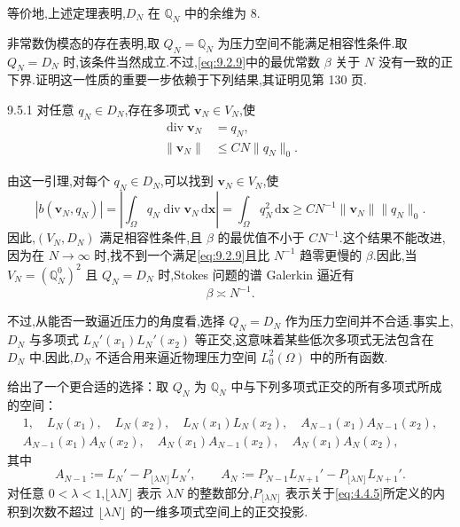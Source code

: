 等价地,上述定理表明,\(D_N\) 在 \(\mathbb Q_N\) 中的余维为 \(8\).

非常数伪模态的存在表明,取 \(Q_N=\mathbb Q_N\) 为压力空间不能满足相容性条件.取 \(Q_N=D_N\) 时,该条件当然成立.不过,\eqref{eq:9.2.9}中的最优常数 \(\beta\) 关于 \(N\) 没有一致的正下界.证明这一性质的重要一步依赖于下列结果,其证明见第 130 页.

\begin{lemma}[]{9.5.1}
对任意 \(q_N\in D_N\),存在多项式 \(\boldsymbol{v}_N\in V_N\),使
\begin{align}
  \operatorname{div}\boldsymbol{v}_N&=q_N,\label{eq:9.5.18}\\
  \|\boldsymbol{v}_N\|&\le CN\|q_N\|_0.\label{eq:9.5.19}
\end{align}
\end{lemma}

由这一引理,对每个 \(q_N\in D_N\),可以找到 \(\boldsymbol{v}_N\in V_N\),使
\[
  |b(\boldsymbol{v}_N,q_N)|=
      \left|\int_\Omega q_N\operatorname{div}\boldsymbol{v}_N\,\mathrm d\boldsymbol{x}\right|
        =\int_\Omega q_N^2\,\mathrm d\boldsymbol{x}
        \ge CN^{-1}\|\boldsymbol{v}_N\|\|q_N\|_0.
\]
因此,\((V_N,D_N)\) 满足相容性条件,且 \(\beta\) 的最优值不小于 \(CN^{-1}\).这个结果不能改进,因为在 \(N\to\infty\) 时,找不到一个满足\eqref{eq:9.2.9}且比 \(N^{-1}\) 趋零更慢的 \(\beta\).因此,当 \(V_N=(\mathbb Q_N^0)^2\) 且 \(Q_N=D_N\) 时,Stokes 问题的谱 Galerkin 逼近有
\begin{equation}\label{eq:9.5.20}
  \beta\asymp N^{-1}.
\end{equation}

不过,从能否一致逼近压力的角度看,选择 \(Q_N=D_N\) 作为压力空间并不合适.事实上,\(D_N\) 与多项式 \(L_N'(x_1)L_N'(x_2)\) 等正交,这意味着某些低次多项式无法包含在 \(D_N\) 中.因此,\(D_N\) 不适合用来逼近物理压力空间 \(L_0^2(\Omega)\) 中的所有函数.

给出了一个更合适的选择：取 \(Q_N\) 为 \(\mathbb Q_N\) 中与下列多项式正交的所有多项式所成的空间：
\[
  \begin{gathered}
    1,\quad L_N(x_1),\quad L_N(x_2),\quad L_N(x_1)L_N(x_2),\quad
         A_{N-1}(x_1)A_{N-1}(x_2),\\
    A_{N-1}(x_1)A_N(x_2),\quad A_N(x_1)A_{N-1}(x_2),\quad A_N(x_1)A_N(x_2),
  \end{gathered}
\]
其中
\[
  A_{N-1}:=L_N'-P_{\lfloor\lambda N\rfloor}L_N',\qquad
  A_N:=P_{N-1}L_{N+1}'-P_{\lfloor\lambda N\rfloor}L_{N+1}'.
\]
对任意 \(0<\lambda<1\),\(\lfloor\lambda N\rfloor\) 表示 \(\lambda N\) 的整数部分,\(P_{\lfloor\lambda N\rfloor}\) 表示关于\eqref{eq:4.4.5}所定义的内积到次数不超过 \(\lfloor\lambda N\rfloor\) 的一维多项式空间上的正交投影.

